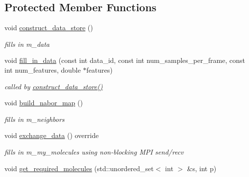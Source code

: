 \subsection*{Protected Member Functions}
\begin{DoxyCompactItemize}
\item 
void \hyperlink{classlbann_1_1data__store__pilot2__molecular_a8021fa0a93e39c9d43de6ecc2d72e14e}{construct\+\_\+data\+\_\+store} ()
\begin{DoxyCompactList}\small\item\em fills in m\+\_\+data \end{DoxyCompactList}\item 
void \hyperlink{classlbann_1_1data__store__pilot2__molecular_a0157fe4d04961c03c0d983cb43aa1cec}{fill\+\_\+in\+\_\+data} (const int data\+\_\+id, const int num\+\_\+samples\+\_\+per\+\_\+frame, const int num\+\_\+features, double $\ast$features)
\begin{DoxyCompactList}\small\item\em called by \hyperlink{classlbann_1_1data__store__pilot2__molecular_a8021fa0a93e39c9d43de6ecc2d72e14e}{construct\+\_\+data\+\_\+store()} \end{DoxyCompactList}\item 
void \hyperlink{classlbann_1_1data__store__pilot2__molecular_af70726cfb8377832ce457d9b874bf34e}{build\+\_\+nabor\+\_\+map} ()
\begin{DoxyCompactList}\small\item\em fills in m\+\_\+neighbors \end{DoxyCompactList}\item 
void \hyperlink{classlbann_1_1data__store__pilot2__molecular_addaa6db4e1b3a25424da9da63c0b3616}{exchange\+\_\+data} () override
\begin{DoxyCompactList}\small\item\em fills in m\+\_\+my\+\_\+molecules using non-\/blocking M\+PI send/recv \end{DoxyCompactList}\item 
void \hyperlink{classlbann_1_1data__store__pilot2__molecular_a7eadb63f1c879c62b587a7b5d972d4e4}{get\+\_\+required\+\_\+molecules} (std\+::unordered\+\_\+set$<$ int $>$ \&s, int p)
\end{DoxyCompactItemize}
